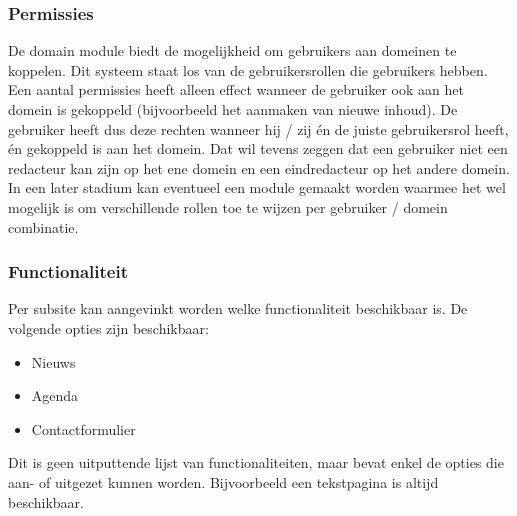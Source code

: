 \subsubsection{Permissies}
De domain module biedt de mogelijkheid om gebruikers aan domeinen te koppelen. Dit systeem staat los van de gebruikersrollen die gebruikers hebben. Een aantal permissies heeft alleen effect wanneer de gebruiker ook aan het domein is gekoppeld (bijvoorbeeld het aanmaken van nieuwe inhoud). De gebruiker heeft dus deze rechten wanneer  hij / zij \'{e}n de juiste gebruikersrol heeft, \'{e}n gekoppeld is aan het domein. Dat wil tevens zeggen dat een gebruiker niet een redacteur kan zijn op het ene domein en een eindredacteur op het andere domein. In een later stadium kan eventueel een module gemaakt worden waarmee het wel mogelijk is om verschillende rollen toe te wijzen per gebruiker / domein combinatie.

\subsubsection{Functionaliteit}
Per subsite kan aangevinkt worden welke functionaliteit beschikbaar is. De volgende opties zijn beschikbaar:
\begin{itemize}
\item Nieuws
\item Agenda
\item Contactformulier
\end{itemize}
Dit is geen uitputtende lijst van functionaliteiten, maar bevat enkel de opties die aan- of uitgezet kunnen worden. Bijvoorbeeld een tekstpagina is altijd beschikbaar.